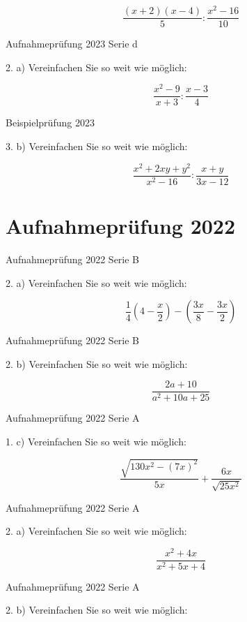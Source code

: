 {$$\frac{(x+2)(x-4)}{5} : \frac{x^2 - 16}{10}$$

Aufnahmeprüfung 2023 Serie d

2. a) Vereinfachen Sie so weit wie möglich:

$$\frac{x^2-9}{x+3} : \frac{x-3}{4}$$

Beispielprüfung 2023

3. b) Vereinfachen Sie so weit wie möglich:

$$\frac{x^2+2xy+y^2}{x^2-16} : \frac{x+y}{3x-12}$$

\section*{Aufnahmeprüfung 2022}
Aufnahmeprüfung 2022 Serie B

2. a) Vereinfachen Sie so weit wie möglich:

$$\frac14 \left(4-\frac{x}2 \right) - \left( \frac{3x}{8} - \frac{3x}{2}\right)$$

Aufnahmeprüfung 2022 Serie B

2. b) Vereinfachen Sie so weit wie möglich:

$$\frac{2a+10}{a^2+10a+25}$$

Aufnahmeprüfung 2022 Serie A

1. c) Vereinfachen Sie so weit wie möglich:

$$\frac{\sqrt{130x^2-(7x)^2}}{5x} + \frac{6x}{\sqrt{25x^2}}$$

Aufnahmeprüfung 2022 Serie A

2. a) Vereinfachen Sie so weit wie möglich:

$$\frac{x^2+4x}{x^2+5x+4}$$

Aufnahmeprüfung 2022 Serie A

2. b) Vereinfachen Sie so weit wie möglich:

}
